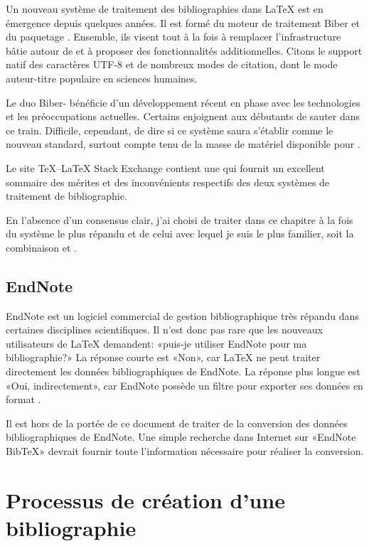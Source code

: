 Un nouveau système de traitement des bibliographies dans {\LaTeX} est
en émergence depuis quelques années. Il est formé du moteur de
traitement Biber \citep{biber} et du paquetage
 \citep{biblatex}. Ensemble, ils visent
tout à la fois à remplacer l'infrastructure bâtie autour de {\BibTeX}
et à proposer des fonctionnalités additionnelles. Citons le support
natif des caractères UTF-8 et de nombreux modes de citation, dont le
mode auteur-titre populaire en sciences humaines.

Le duo Biber- bénéficie d'un développement récent en
phase avec les technologies et les préoccupations actuelles. Certains
enjoignent aux débutants de sauter dans ce train. Difficile,
cependant, de dire si ce système saura s'établir comme le nouveau
standard, surtout compte tenu de la masse de matériel disponible pour
{\BibTeX}.

Le site {\TeX}--{\LaTeX} Stack Exchange contient une %
qui fournit un excellent sommaire des mérites et des inconvénients
respectifs des deux systèmes de traitement de bibliographie.

En l'absence d'un consensus clair, j'ai choisi de traiter dans ce
chapitre à la fois du système le plus répandu et de celui avec lequel
je suis le plus familier, soit la combinaison {\BibTeX} et
.

\subsection{EndNote}
\label{sec:bibliographie:systeme:endnote}

EndNote est un logiciel commercial de gestion bibliographique très
répandu dans certaines disciplines scientifiques. Il n'est donc pas
rare que les nouveaux utilisateurs de {\LaTeX} demandent: «puis-je
utiliser EndNote pour ma bibliographie?» La réponse courte est «Non»,
car {\LaTeX} ne peut traiter directement les données bibliographiques
de EndNote. La réponse plus longue est «Oui, indirectement»,
car EndNote possède un filtre pour exporter ses données en format
{\BibTeX}.

Il est hors de la portée de ce document de traiter de la conversion
des données bibliographiques de EndNote. Une simple recherche dans
Internet sur «EndNote BibTeX» devrait fournir toute l'information
nécessaire pour réaliser la conversion.


\section{Processus de création d'une bibliographie}
\label{sec:bibliographie:processus}

